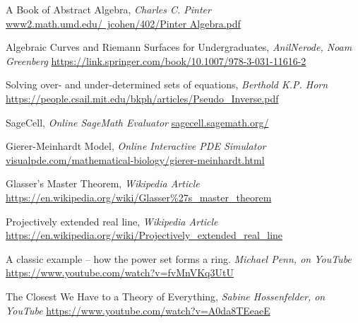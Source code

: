 \documentclass[12pt, oneside]{book}
\begin{document}

%  

\begin{thebibliography}{9}
	
 A Book of Abstract Algebra, \textit{Charles C. Pinter}  \newline
\href{http://www2.math.umd.edu/~jcohen/402/Pinter%20Algebra.pdf}
     {www2.math.umd.edu/~jcohen/402/Pinter Algebra.pdf}

 Algebraic Curves and Riemann Surfaces for Undergraduates, 
\textit{AnilNerode, Noam Greenberg}  \newline
\href{https://link.springer.com/book/10.1007/978-3-031-11616-2}
     {https://link.springer.com/book/10.1007/978-3-031-11616-2}

 Solving over- and under-determined sets of equations, 
\textit{Berthold K.P. Horn}  \newline
\href{https://people.csail.mit.edu/bkph/articles/Pseudo_Inverse.pdf}
     {https://people.csail.mit.edu/bkph/articles/Pseudo\_Inverse.pdf}

 SageCell, \textit{Online SageMath Evaluator}  \newline
\href{https://sagecell.sagemath.org/}
     {sagecell.sagemath.org/}

 Gierer-Meinhardt Model, 
\textit{Online Interactive PDE Simulator}  \newline
\href{https://visualpde.com/mathematical-biology/gierer-meinhardt.html}
     {visualpde.com/mathematical-biology/gierer-meinhardt.html}

 Glasser's Master Theorem, \textit{Wikipedia Article} \newline
\href{https://en.wikipedia.org/wiki/Glasser%27s_master_theorem}
     {https://en.wikipedia.org/wiki/Glasser\%27s\_master\_theorem}

 Projectively extended real line, \textit{Wikipedia Article} \newline
\href{https://en.wikipedia.org/wiki/Projectively_extended_real_line}
     {https://en.wikipedia.org/wiki/Projectively\_extended\_real\_line}

 A classic example -- how the power set forms a ring. 
\textit{Michael Penn, on YouTube}
\href{https://www.youtube.com/watch?v=fvMnVKq3UtU}
     {https://www.youtube.com/watch?v=fvMnVKq3UtU}
     
 The Closest We Have to a Theory of Everything,
\textit{Sabine Hossenfelder, on YouTube}
\href{https://www.youtube.com/watch?v=A0da8TEeaeE}
     {https://www.youtube.com/watch?v=A0da8TEeaeE}     


\end{thebibliography}
\end{document}
